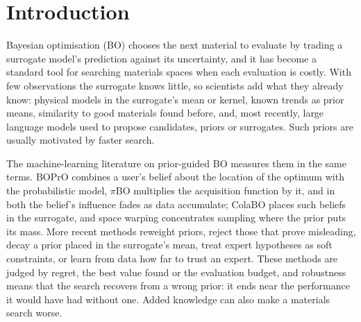 \section{Introduction}\label{sec:intro}

Bayesian optimisation (BO) chooses the next material to evaluate by trading a surrogate model's prediction against its
uncertainty\cite{jones1998ego,shahriari2016human,garnett2023bo}, and it has become a standard tool for searching materials spaces
when each evaluation is costly\cite{lookman2019active,liang2021benchmarking}. With few observations the surrogate knows little,
so scientists add what they already know: physical models in the surrogate's mean or kernel\cite{ziatdinov2022physics,
khatamsaz2023physics}, known trends as prior means\cite{aoki2026explicitly}, similarity to good materials found before, and, most
recently, large language models used to propose candidates, priors or surrogates\cite{liu2024llambo,chen2026evidencegated,
kristiadi2024sober}. Such priors are usually motivated by faster search.

The machine-learning literature on prior-guided BO measures them in the same terms. BOPrO combines a user's belief about the
location of the optimum with the probabilistic model, $\pi$BO multiplies the acquisition function by it, and in both the
belief's influence fades as data accumulate\cite{souza2021bopro,hvarfner2022pibo}; ColaBO places such beliefs in the surrogate\cite{hvarfner2024colabo}, and space warping concentrates
sampling where the prior puts its mass\cite{ramachandran2020warping}. More recent methods reweight priors, reject those that prove
misleading, decay a prior placed in the surrogate's mean, treat expert hypotheses as soft constraints, or learn from data how far to
trust an expert\cite{guayhottin2025alphapibo,fehring2025dynabo,qu2026dynmeanbo,cisse2024hypbo,xu2024principled}. These methods
are judged by regret, the best value found or the evaluation budget\cite{hennig2026psh}, and robustness means that the search
recovers from a wrong prior: it ends near the performance it would have had without one. Added knowledge can also make a materials
search worse\cite{weichert2025lessismore}.

